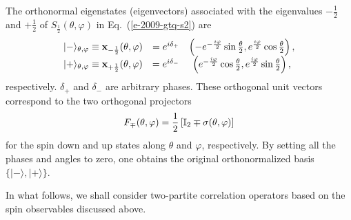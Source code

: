 \documentclass[pra,amsfonts,showpacs,showkeys,preprint]{revtex4}
\begin{document}
The  orthonormal eigenstates (eigenvectors)  associated with the eigenvalues $-\frac{1}{2}$ and $+\frac{1}{2}$ of
$S_\frac{1}{2}(\theta , \varphi )$ in Eq.~(\ref{e-2009-gtq-s2})
are
\begin{equation}
\label{e-2009-gtq-s2ev}
\begin{array}{cccc}
\vert -\rangle_{\theta ,\varphi} \equiv {\bf x}_{-\frac{1}{2}}(\theta ,\varphi)&=e^{i\delta_{+}}& \left(-
e^{-\frac{i\varphi}{2}} \sin{\theta \over 2} ,e^{\frac{i\varphi}{2}}  \cos{\theta \over 2}
\right),\\
\vert +\rangle_{\theta ,\varphi} \equiv {\bf x}_{+\frac{1}{2}}(\theta ,\varphi)&=e^{i\delta_{-}}& \left(
e^{-\frac{i\varphi}{2}} \cos{\theta \over 2}, e^{\frac{i\varphi}{2}}\sin{\theta \over 2}
\right) ,
\end{array}
\end{equation}
respectively. $\delta_{+}$ and $\delta_{-}$ are arbitrary phases.
These orthogonal unit vectors correspond to the two orthogonal projectors
\begin{equation}
\label{e-2009-gtq-s2evproj}
F_\mp (\theta ,\varphi ) =
\frac{1}{2}
\left[
{\Bbb I}_2 \mp \sigma (\theta ,\varphi)
\right]
\end{equation}
for the spin down and up states along $\theta $ and $\varphi$, respectively.
By setting all the phases and angles to zero, one obtains the original
orthonormalized basis $\{\vert -\rangle,\vert +\rangle\}$.

In what follows, we shall consider two-partite correlation operators based on the spin observables discussed above.
\end{document}
